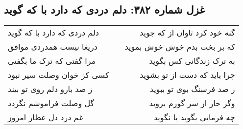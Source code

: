 \begin{center}
\section*{غزل شماره ۳۸۲: دلم دردی که دارد با که گوید}
\label{sec:382}
\begin{longtable}{l p{0.5cm} r}
دلم دردی که دارد با که گوید
&&
گنه خود کرد تاوان از که جوید
\\
دریغا نیست همدردی موافق
&&
که بر بخت بدم خوش خوش بموید
\\
مرا گفتی که ترک ما بگفتی
&&
به ترک زندگانی کس بگوید
\\
کسی کز خوان وصلت سیر نبود
&&
چرا باید که دست از تو بشوید
\\
ز صد بارو دلم روی تو بیند
&&
ز صد فرسنگ بوی تو ببوید
\\
گل وصلت فراموشم نگردد
&&
وگر خار از سر گورم بروید
\\
غم درد دل عطار امروز
&&
چه فرمایی بگوید یا نگوید
\\
\end{longtable}
\end{center}
